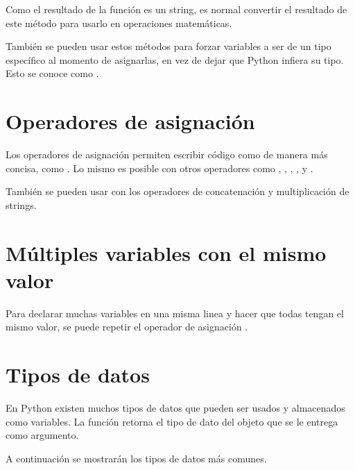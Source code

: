 Como el resultado de la función  es un string, es normal convertir el resultado de este método para usarlo en operaciones matemáticas.


También se pueden usar estos métodos para forzar variables a ser de un tipo específico al momento de asignarlas, en vez de dejar que Python infiera su tipo. Esto se conoce como .


\section{Operadores de asignación}

Los operadores de asignación permiten escribir código como  de manera más concisa, como . Lo mismo es posible con otros operadores como \ttt{-}, \ttt{*}, \ttt{/}, \ttt{//}, \ttt{\%} y \ttt{**}.


También se pueden usar con los operadores de concatenación y multiplicación de strings.


\section{Múltiples variables con el mismo valor}

Para declarar muchas variables en una misma linea y hacer que todas tengan el mismo valor, se puede repetir el operador de asignación \ttt{=}.


\section{Tipos de datos}

En Python existen muchos tipos de datos que pueden ser usados y almacenados como variables. La función  retorna el tipo de dato del objeto que se le entrega como argumento.\smallskip

A continuación se mostrarán los tipos de datos más comunes.

